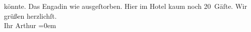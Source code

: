 \begin{ledgroupsized}[t]{13cm}
               könnte. Das Engadin wie ausgeſtorben. Hier im Hotel kaum noch 20 Gäſte.\pend
           \pstart
           Wir grüßen herzlichſt.{\\[\baselineskip]}Ihr \spacefill\mbox{Arthur}\pend
           \leftskip=0em{}\endnumbering{}\end{ledgroupsized}  \newcommand{\dateiname}{L02189}\newcommand{\titel}{Arthur Schnitzler an Richard Beer-Hofmann, 2. 8. 1914}\newcommand{\editorInnen}{Martin Anton Müller und Gerd-Hermann Susen}
      